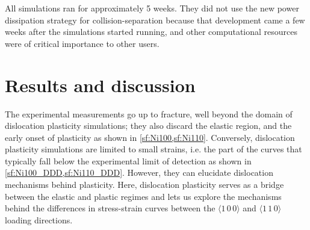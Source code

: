 All simulations ran for approximately 5 weeks. They did not use the new power dissipation strategy for collision-separation because that development came a few weeks after the simulations started running, and other computational resources were of critical importance to other users.

\section{Results and discussion}
\label{s:NiResults}

The experimental measurements go up to fracture, well beyond the domain of dislocation plasticity simulations; they also discard the elastic region, and the early onset of plasticity as shown in \cref{sf:Ni100,sf:Ni110}. Conversely, dislocation plasticity simulations are limited to small strains, i.e. the part of the curves that typically fall below the experimental limit of detection as shown in \cref{sf:Ni100_DDD,sf:Ni110_DDD}. However, they can elucidate dislocation mechanisms behind plasticity. Here, dislocation plasticity serves as a bridge between the elastic and plastic regimes and lets us explore the mechanisms behind the differences in stress-strain curves between the $\langle 1\,0\,0 \rangle$ and $\langle 1\,1\,0 \rangle$ loading directions.
